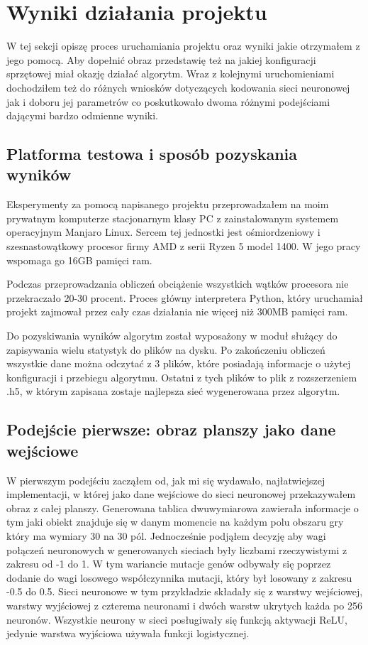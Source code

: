 \documentclass[12pt, oneside, a4paper]{report}
\begin{document}
\chapter{Wyniki działania projektu}

W tej sekcji opiszę proces uruchamiania projektu oraz wyniki jakie otrzymałem z jego pomocą. Aby dopełnić obraz przedstawię też na jakiej konfiguracji sprzętowej miał okazję działać algorytm. Wraz z kolejnymi uruchomieniami dochodziłem też do różnych wniosków dotyczących kodowania sieci neuronowej jak i doboru jej parametrów co poskutkowało dwoma różnymi podejściami dającymi bardzo odmienne wyniki.

\section{Platforma testowa i sposób pozyskania wyników}

Eksperymenty za pomocą napisanego projektu przeprowadzałem na moim prywatnym komputerze stacjonarnym klasy PC z zainstalowanym systemem operacyjnym Manjaro Linux. Sercem tej jednostki jest ośmiordzeniowy i szesnastowątkowy procesor firmy AMD z serii Ryzen 5 model 1400. W jego pracy wspomaga go 16GB pamięci ram.

Podczas przeprowadzania obliczeń obciążenie wszystkich wątków procesora nie przekraczało 20-30 procent. Proces główny interpretera Python, który uruchamiał projekt zajmował przez cały czas działania nie więcej niż 300MB pamięci ram.

Do pozyskiwania wyników algorytm został wyposażony w moduł służący do zapisywania wielu statystyk do plików na dysku. Po zakończeniu obliczeń wszystkie dane można odczytać z 3 plików, które posiadają informacje o użytej konfiguracji i przebiegu algorytmu. Ostatni z tych plików to plik z rozszerzeniem .h5, w którym zapisana zostaje najlepsza sieć wygenerowana przez algorytm.

\section{Podejście pierwsze: obraz planszy jako dane wejściowe}

W pierwszym podejściu zacząłem od, jak mi się wydawało, najłatwiejszej implementacji, w której jako dane wejściowe do sieci neuronowej przekazywałem obraz z całej planszy. Generowana tablica dwuwymiarowa zawierała informacje o tym jaki obiekt znajduje się w danym momencie na każdym polu obszaru gry który ma wymiary 30 na 30 pól. Jednocześnie podjąłem decyzję aby wagi połączeń neuronowych w generowanych sieciach były liczbami rzeczywistymi z zakresu od -1 do 1. W tym wariancie mutacje genów odbywały się poprzez dodanie do wagi losowego współczynnika mutacji, który był losowany z zakresu -0.5 do 0.5. Sieci neuronowe w tym przykładzie składały się z warstwy wejściowej, warstwy wyjściowej z czterema neuronami i dwóch warstw ukrytych każda po 256 neuronów. Wszystkie neurony w sieci posługiwały się funkcją aktywacji ReLU, jedynie warstwa wyjściowa używała funkcji logistycznej.
\end{document}

